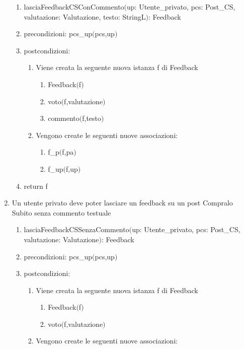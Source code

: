 \documentclass{article}
\begin{document}
\begin{enumerate}
\begin{enumerate}
        \item lasciaFeedbackCSConCommento$($up: Utente\_privato, pcs: Post\_CS, valutazione: Valutazione, testo: StringL$)$: Feedback
        \item precondizioni: pcs\_up$($pcs,up$)$
        \item postcondizioni:
        \begin{enumerate}
            \item Viene creata la seguente nuova istanza f di Feedback
            \begin{enumerate}
                \item Feedback$($f$)$
                \item voto$($f,valutazione$)$
                \item commento$($f,testo$)$
            \end{enumerate}
            \item Vengono create le seguenti nuove associazioni:
            \begin{enumerate}
                \item f\_p$($f,pa$)$
                \item f\_up$($f,up$)$
            \end{enumerate}
        \end{enumerate}
        \item return f
    \end{enumerate}
    \newpage
    \item\label{sec:lasciaFeedbackCSSenzaCommento} Un utente privato deve poter lasciare un feedback su un post Compralo Subito senza commento testuale
    \begin{enumerate}
        \item lasciaFeedbackCSSenzaCommento$($up: Utente\_privato, pcs: Post\_CS, valutazione: Valutazione$)$: Feedback
        \item precondizioni: pcs\_up$($pcs,up$)$
        \item postcondizioni:
        \begin{enumerate}
            \item Viene creata la seguente nuova istanza f di Feedback
            \begin{enumerate}
                \item Feedback$($f$)$
                \item voto$($f,valutazione$)$
            \end{enumerate}
            \item Vengono create le seguenti nuove associazioni:

\end{enumerate}
\end{enumerate}
\end{enumerate}
\end{document}
